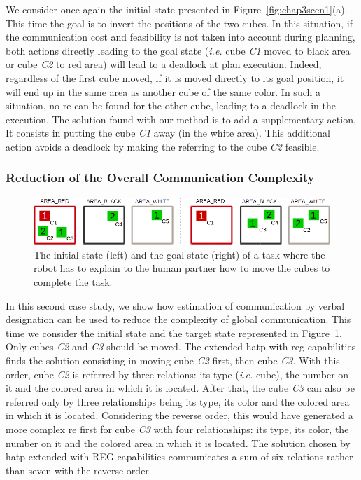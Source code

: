 \documentclass[a4paper,11pt,twoside]{StyleThese}
\begin{document}
We consider once again the initial state presented in Figure~\ref{fig:chap3scen1}(a). This time the goal is to invert the positions of the two cubes. In this situation, if the communication cost and feasibility is not taken into account during planning, both actions directly leading to the goal state (\textit{i.e.} cube \textit{C1} moved to black area or cube \textit{C2} to red area) will lead to a deadlock at plan execution. Indeed, regardless of the first cube moved, if it is moved directly to its goal position, it will end up in the same area as another cube of the same color. In such a situation, no \acrshort{re} can be found for the other cube, leading to a deadlock in the execution.
The solution found with our method is to add a supplementary action. It consists in putting the cube \textit{C1} away (in the white area). This additional action avoids a deadlock by making the referring to the cube \textit{C2} feasible.

\subsubsection{Reduction of the Overall Communication Complexity}

\begin{figure}[t!]
\centering
\includegraphics[width=\textwidth]{figures/chapter3/setup2.png}
\caption{\label{fig:case2} The initial state (left) and the goal state (right) of a task where the robot has to explain to the human partner how to move the cubes to complete the task. }
\end{figure}

In this second case study, we show how estimation of communication by verbal designation can be used to reduce the complexity of global communication. This time we consider the initial state and the target state represented in Figure~\ref{fig:case2}. Only cubes \textit{C2} and \textit{C3} should be moved. The extended \acrshort{hatp} with \acrshort{reg} capabilities finds the solution consisting in moving cube \textit{C2} first, then cube \textit{C3}. With this order, cube \textit{C2} is referred by three relations: its type (\textit{i.e.} cube), the number on it and the colored area in which it is located. After that, the cube \textit{C3} can also be referred only by three relationships being its type, its color and the colored area in which it is located. Considering the reverse order, this would have generated a more complex \acrshort{re} first for cube \textit{C3} with four relationships: its type, its color, the number on it and the colored area in which it is located.
The solution chosen by \acrshort{hatp} extended with REG capabilities communicates a sum of six relations rather than seven with the reverse order.
\end{document}
